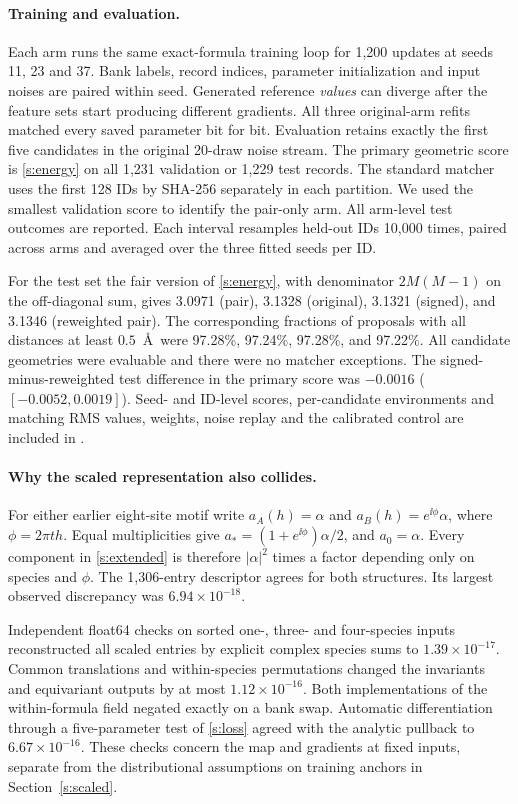\paragraph{Training and evaluation.}
Each arm runs the same exact-formula training loop for 1,200 updates at seeds 11, 23 and 37. Bank labels, record indices, parameter initialization and input noises are paired within seed. Generated reference \emph{values} can diverge after the feature sets start producing different gradients. All three original-arm refits matched every saved parameter bit for bit. Evaluation retains exactly the first five candidates in the original 20-draw noise stream. The primary geometric score is \eqref{s:energy} on all 1,231 validation or 1,229 test records. The standard matcher uses the first 128 IDs by SHA-256 separately in each partition. We used the smallest validation score to identify the pair-only arm. All arm-level test outcomes are reported. Each interval resamples held-out IDs 10,000 times, paired across arms and averaged over the three fitted seeds per ID.

For the test set the fair version of \eqref{s:energy}, with denominator $2M(M-1)$ on the off-diagonal sum, gives 3.0971 (pair), 3.1328 (original), 3.1321 (signed), and 3.1346 (reweighted pair). The corresponding fractions of proposals with all distances at least $0.5$~\AA\ were 97.28\%, 97.24\%, 97.28\%, and 97.22\%. All candidate geometries were evaluable and there were no matcher exceptions. The signed-minus-reweighted test difference in the primary score was $-0.0016$ ($[-0.0052,0.0019]$). Seed- and ID-level scores, per-candidate environments and matching RMS values, weights, noise replay and the calibrated control are included in .

\paragraph{Why the scaled representation also collides.}
For either earlier eight-site motif write $a_A(h)=\alpha$ and $a_B(h)=e^{\ii\phi}\alpha$, where $\phi=2\pi th$. Equal multiplicities give $a_*=(1+e^{\ii\phi})\alpha/2$, and $a_0=\alpha$. Every component in \eqref{s:extended} is therefore $|\alpha|^2$ times a factor depending only on species and $\phi$. The 1,306-entry descriptor agrees for both structures. Its largest observed discrepancy was $6.94\times10^{-18}$.

Independent float64 checks on sorted one-, three- and four-species inputs reconstructed all scaled entries by explicit complex species sums to $1.39\times10^{-17}$. Common translations and within-species permutations changed the invariants and equivariant outputs by at most $1.12\times10^{-16}$. Both implementations of the within-formula field negated exactly on a bank swap. Automatic differentiation through a five-parameter test of \eqref{s:loss} agreed with the analytic pullback to $6.67\times10^{-16}$. These checks concern the map and gradients at fixed inputs, separate from the distributional assumptions on training anchors in Section~\ref{s:scaled}.

\endgroup
